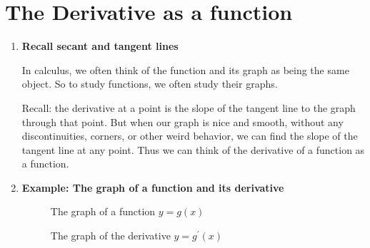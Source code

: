 \section{The Derivative as a function}
\begin{enumerate}
    \item \textbf{Recall secant and tangent lines}

        In calculus, we often think of the function and its graph as being the same object. So to study functions, we often study their graphs.

        Recall: the derivative at a point is the slope of the tangent line to the graph through that point. But when our graph is nice and smooth, without any discontinuities, corners, or other weird behavior, we can find the slope of the tangent line at any point. Thus we can think of the derivative of a function as a function.
    \item \textbf{Example: The graph of a function and its derivative}
        \begin{figure}[H]
            \centering
            \caption{The graph of a function $y=g(x)$}
        \end{figure}
        \begin{figure}[H]
            \centering
            \caption{The graph of the derivative $y=g^\prime (x)$}
        \end{figure}
\end{enumerate}
